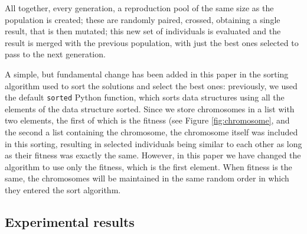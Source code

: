 \documentclass[sigconf]{acmart}
\begin{document}
All together, every generation, a reproduction pool of the same size
as the population is created; these are randomly paired,
crossed, obtaining a single result, that is then mutated; this new set
of individuals is evaluated and the result is merged with
the previous population, with just the best ones selected to pass to
the next generation.

A simple, but fundamental change has been added in this paper in the
sorting algorithm used to sort the solutions and select the best
ones: previously, we used the default {\tt sorted} Python function,
which sorts data structures using all the elements of the data
structure sorted. Since we store chromosomes in a list with two
elements, the first of which is the fitness (see Figure \ref{fig:chromosome}, and the second  a list
containing the chromosome, the chromosome itself was included in this
sorting, resulting in selected individuals being similar to each other
as long as their fitness was exactly the same. However, in this paper
we have changed the algorithm to use only the fitness, which is the
first element. When fitness is the same, the chromosomes will be
maintained in the same random order in which they entered the sort
algorithm.


\subsection{Experimental results}
\label{subs:results}
\end{document}
